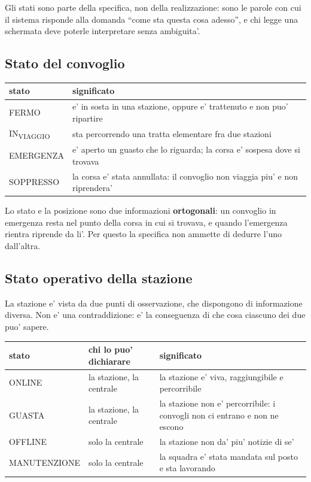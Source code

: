 \documentclass[11pt]{article}
\begin{document}
Gli stati sono parte della specifica, non della realizzazione: sono le parole con cui il sistema
risponde alla domanda ``come sta questa cosa adesso'', e chi legge una schermata deve poterle
interpretare senza ambiguita'.
\subsection{Stato del convoglio}
\label{sec:org1141e36}

\begin{center}
\begin{tabular}{|p{}|p{}|}
stato & significato\\
\hline
FERMO & e' in sosta in una stazione, oppure e' trattenuto e non puo' ripartire\\
IN\textsubscript{VIAGGIO} & sta percorrendo una tratta elementare fra due stazioni\\
EMERGENZA & e' aperto un guasto che lo riguarda; la corsa e' sospesa dove si trovava\\
SOPPRESSO & la corsa e' stata annullata: il convoglio non viaggia piu' e non riprendera'\\
\end{tabular}
\end{center}

Lo stato e la posizione sono due informazioni \textbf{ortogonali}: un convoglio in emergenza resta nel punto
della corsa in cui si trovava, e quando l'emergenza rientra riprende da li'. Per questo la
specifica non ammette di dedurre l'uno dall'altra.
\subsection{Stato operativo della stazione}
\label{sec:orgc6f1972}

La stazione e' vista da due punti di osservazione, che dispongono di informazione diversa. Non e' una
contraddizione: e' la conseguenza di che cosa ciascuno dei due puo' sapere.

\begin{center}
\begin{tabular}{|p{}|p{}|p{}|}
stato & chi lo puo' dichiarare & significato\\
\hline
ONLINE & la stazione, la centrale & la stazione e' viva, raggiungibile e percorribile\\
GUASTA & la stazione, la centrale & la stazione non e' percorribile: i convogli non ci entrano e non ne escono\\
OFFLINE & solo la centrale & la stazione non da' piu' notizie di se'\\
MANUTENZIONE & solo la centrale & la squadra e' stata mandata sul posto e sta lavorando\\
\end{tabular}
\end{center}
\end{document}
